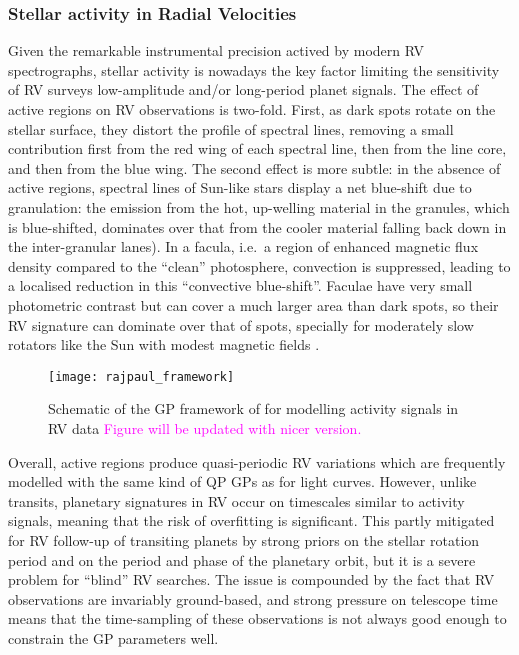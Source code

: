 \documentclass[letterpaper]{ar-1col}
\newcommand{\suz}[1]{\textcolor{magenta}{#1}}
\begin{document}
\subsubsection{Stellar activity in Radial Velocities}
Given the remarkable instrumental precision actived by modern RV spectrographs, stellar activity is nowadays the key factor limiting the sensitivity of RV surveys low-amplitude and/or long-period planet signals. The effect of active regions on RV observations is two-fold. First, as dark spots rotate on the stellar surface, they distort the profile of spectral lines, removing a small contribution first from the red wing of each spectral line, then from the line core, and then from the blue wing. The second effect is more subtle: in the absence of active regions, spectral lines of Sun-like stars display a net blue-shift due to granulation: the emission from the hot, up-welling material in the granules, which is blue-shifted, dominates over that from the cooler material falling back down in the inter-granular lanes). In a facula, i.e.\ a region of enhanced magnetic flux density compared to the ``clean'' photosphere, convection is suppressed, leading to a localised reduction in this ``convective blue-shift''. Faculae have very small photometric contrast but can cover a much larger area than dark spots, so their RV signature can dominate over that of spots, specially for moderately slow rotators like the Sun with modest magnetic fields \citep{2010A&A...512A..39M}.

\begin{figure}[h]
  \texttt{[image: rajpaul\_framework]}
  \caption{Schematic of the GP framework of \citet{2015MNRAS.452.2269R} for modelling activity signals in RV data \suz{Figure will be updated with nicer version.}}
  \label{fig:multiGPRV}
\end{figure}

Overall, active regions produce quasi-periodic RV variations which are frequently modelled with the same kind of QP GPs as for light curves. However, unlike transits, planetary signatures in RV occur on timescales similar to activity signals, meaning that the risk of overfitting is significant. This partly mitigated for RV follow-up of transiting planets by strong priors on the stellar rotation period and on the period and phase of the planetary orbit, but it is a severe problem for ``blind'' RV searches. The issue is compounded by the fact that RV observations are invariably ground-based, and strong pressure on telescope time means that the time-sampling of these observations is not always good enough to constrain the GP parameters well.
\end{document}

